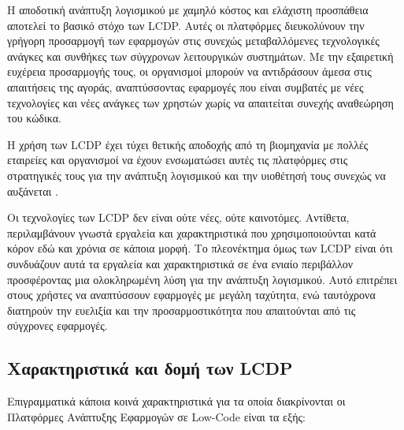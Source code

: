         Η αποδοτική ανάπτυξη λογισμικού με χαμηλό κόστος και ελάχιστη προσπάθεια αποτελεί το βασικό στόχο των LCDP. Αυτές οι πλατφόρμες διευκολύνουν την γρήγορη προσαρμογή των εφαρμογών στις συνεχώς μεταβαλλόμενες τεχνολογικές ανάγκες και συνθήκες των σύγχρονων λειτουργικών συστημάτων. Με την εξαιρετική ευχέρεια προσαρμογής τους, οι οργανισμοί μπορούν να αντιδράσουν άμεσα στις απαιτήσεις της αγοράς, αναπτύσσοντας εφαρμογές που είναι συμβατές με νέες τεχνολογίες και νέες ανάγκες των χρηστών χωρίς να απαιτείται συνεχής αναθεώρηση του κώδικα.

        Η χρήση των LCDP έχει τύχει θετικής αποδοχής από τη βιομηχανία με πολλές εταιρείες και οργανισμοί να έχουν ενσωματώσει αυτές τις πλατφόρμες στις στρατηγικές τους για την ανάπτυξη λογισμικού και την υιοθέτησή τους συνεχώς να αυξάνεται \cite{Bock2021,Bucaioni2022,Sahay2020}.

        Οι τεχνολογίες των LCDP δεν είναι ούτε νέες, ούτε καινοτόμες. Αντίθετα, περιλαμβάνουν γνωστά εργαλεία και χαρακτηριστικά που χρησιμοποιούνται κατά κόρον εδώ και χρόνια σε κάποια μορφή. Το πλεονέκτημα όμως των LCDP είναι ότι συνδυάζουν αυτά τα εργαλεία και χαρακτηριστικά σε ένα ενιαίο περιβάλλον προσφέροντας μια ολοκληρωμένη λύση για την ανάπτυξη λογισμικού. Αυτό επιτρέπει στους χρήστες να αναπτύσσουν εφαρμογές με μεγάλη ταχύτητα, ενώ ταυτόχρονα διατηρούν την ευελιξία και την προσαρμοστικότητα που απαιτούνται από τις σύγχρονες εφαρμογές.

        \subsection{Χαρακτηριστικά και δομή των LCDP}
            Επιγραμματικά κάποια κοινά χαρακτηριστικά για τα οποία διακρίνονται οι Πλατφόρμες Ανάπτυξης Εφαρμογών σε Low-Code είναι τα εξής:

